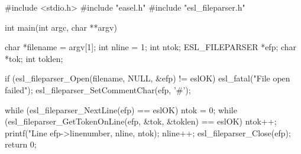 \begin{cchunk}
#include <stdio.h>
#include "easel.h"
#include "esl_fileparser.h"

int 
main(int argc, char **argv)
{
  char           *filename = argv[1];
  int             nline    = 1;
  int             ntok;
  ESL_FILEPARSER *efp;
  char           *tok;
  int             toklen;

  if (esl_fileparser_Open(filename, NULL, &efp) != eslOK) esl_fatal("File open failed");
  esl_fileparser_SetCommentChar(efp, '#');
  
  while (esl_fileparser_NextLine(efp) == eslOK)
  {
    ntok = 0;
    while (esl_fileparser_GetTokenOnLine(efp, &tok, &toklen) == eslOK)
      ntok++;
    printf("Line %
	   efp->linenumber, nline, ntok);
    nline++;
  }
  esl_fileparser_Close(efp);
  return 0;
}
\end{cchunk}
